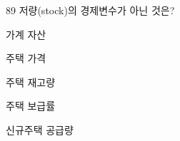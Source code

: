 \begin{question}{89}
저량(stock)의 경제변수가 아닌 것은?
\begin{choices}
  \item 가계 자산
  \item 주택 가격
  \item 주택 재고량
  \item 주택 보급률
  \item 신규주택 공급량
\end{choices}
\end{question}
